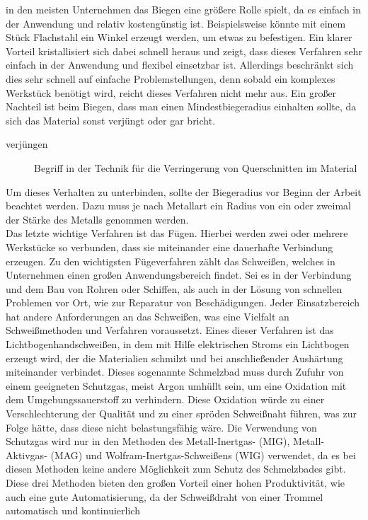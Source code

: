in den meisten Unternehmen das Biegen eine größere Rolle spielt, da es einfach in der Anwendung und relativ kostengünstig ist. Beispielsweise könnte mit einem 
Stück Flachstahl ein Winkel erzeugt werden, um etwas zu befestigen. Ein klarer Vorteil kristallisiert sich dabei schnell heraus und zeigt, dass dieses 
Verfahren sehr einfach in der Anwendung und flexibel einsetzbar ist. Allerdings beschränkt sich dies sehr schnell auf einfache Problemstellungen, denn 
sobald ein komplexes Werkstück benötigt wird, reicht dieses Verfahren nicht mehr aus. Ein großer Nachteil ist beim Biegen, dass man einen Mindestbiegeradius 
einhalten sollte, da sich das Material sonst verjüngt oder gar bricht.
\begin{description}
\item[verjüngen] Begriff in der Technik für die Verringerung von Querschnitten im Material
\end{description}
Um dieses Verhalten zu unterbinden, sollte der Biegeradius vor Beginn der Arbeit beachtet werden. Dazu muss je nach Metallart ein Radius von ein oder zweimal 
der Stärke des Metalls genommen werden.\\
Das letzte wichtige Verfahren ist das Fügen. Hierbei werden zwei oder mehrere Werkstücke so verbunden, dass sie miteinander eine dauerhafte Verbindung 
erzeugen. Zu den wichtigsten Fügeverfahren zählt das Schweißen, welches in Unternehmen einen großen Anwendungsbereich findet. Sei es in der Verbindung 
und dem Bau von Rohren oder Schiffen, als auch in der Lösung von schnellen Problemen vor Ort, wie \zB zur Reparatur von Beschädigungen. Jeder Einsatzbereich 
hat andere Anforderungen an das Schweißen, was eine Vielfalt an Schweißmethoden und Verfahren voraussetzt. Eines dieser Verfahren ist das 
Lichtbogenhandschweißen, in dem mit Hilfe elektrischen Stroms ein Lichtbogen erzeugt wird, der die Materialien schmilzt und bei anschließender 
Aushärtung miteinander verbindet. Dieses sogenannte Schmelzbad muss durch Zufuhr von einem geeigneten Schutzgas, meist Argon umhüllt sein, um eine Oxidation 
mit dem Umgebungssauerstoff zu verhindern. Diese Oxidation würde zu einer Verschlechterung der Qualität und zu einer spröden Schweißnaht führen, was zur 
Folge hätte, dass diese nicht belastungsfähig wäre. Die Verwendung von Schutzgas wird nur in den Methoden des Metall-Inertgas- (MIG), Metall-Aktivgas- (MAG) 
und Wolfram-Inertgas-Schweißens (WIG) verwendet, da es bei diesen Methoden keine andere Möglichkeit zum Schutz des Schmelzbades gibt. Diese drei Methoden 
bieten den großen Vorteil einer hohen Produktivität, wie auch eine gute Automatisierung, da der Schweißdraht von einer Trommel automatisch und kontinuierlich 
